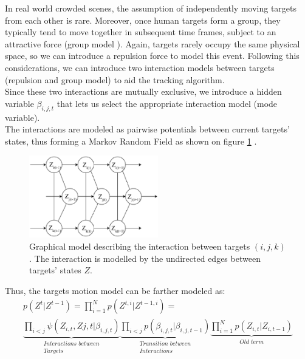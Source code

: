 In real world crowded scenes, the assumption of independently moving targets from each other is rare. Moreover, once human targets form a group, they typically tend to move together in subsequent time frames, subject to an attractive force (group model ). Again, targets rarely occupy the same physical space, so we can introduce a repulsion force to model this event. Following this considerations, we can introduce two interaction models between targets (repulsion and group model) to aid the tracking algorithm.\\
Since these two interactions are mutually exclusive, we introduce a hidden variable $\beta_{i,j,t}$ that lets us select the appropriate interaction model (mode
variable).\\
The interactions are modeled as pairwise potentials between current targets’ states, thus forming a Markov Random Field as shown on figure \ref{fig: gm_mtt2} .
\begin{figure}\label{fig: gm_mtt2}
\includegraphics[width=0.5\textwidth]{ImaginiLatex/gm_mtt2.eps} 
\caption{ Graphical model describing the interaction between
targets $(i, j, k)$. The interaction is modelled by the undirected edges between   targets’ states $Z$.}
\end{figure}
Thus, the targets motion model can be farther modeled as:
\begin{eqnarray}\label{eqn: transition factorized 2}
p(Z^{t} |Z^{t-1} ) = \prod_{i=1}^{N} p(Z^{t,i} | Z^{t-1,i})= \nonumber \\
\underbrace{\prod_{i<j} \psi(Z_{i,t} , Z{j,t} |\beta_{i,j,t})}_{\substack{\textit{Interactions between} \\ \textit{Targets}}}
\underbrace{\prod_{i<j} p(\beta_{i,j,t} |\beta_{i,j,t-1} ) }_{\substack{\textit{Transition between} \\ \textit{Interactions}}}
\underbrace{\prod_{i=1}^{N} p(Z_{i,t} |Z_{i,t-1})}_{\substack{\textit{Old term} }}
\end{eqnarray}


